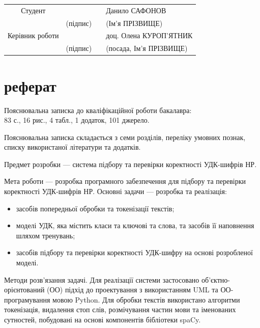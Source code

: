 \documentclass[14pt]{extarticle}
\let\oldsection\section
\renewcommand{\section}{\clearpage\oldsection}
\begin{document}
\vspace{\baselineskip}
\begin{flushright}
\begin{tabular}{clp{0.7cm}l}
  Студент         &                                      & & Данило САФОНОВ \\ \cline{2-2} \cline{4-4}
                  & \fontsize{10}{10}\selectfont(підпис) & & \fontsize{10}{10}\selectfont(Ім’я ПРІЗВИЩЕ) \\
  Керівник роботи &                                      & & доц. Олена КУРОП'ЯТНИК \\ \cline{2-2} \cline{4-4}
                  & \fontsize{10}{10}\selectfont(підпис) & & \fontsize{10}{10}\selectfont(посада, Ім’я ПРІЗВИЩЕ)\\
\end{tabular}
\end{flushright}

\section*{реферат}
\thispagestyle{empty}
Пояснювальна записка до кваліфікаційної роботи бакалавра:\\
83 с., 16 рис., 4 табл., 1 додаток, 101 джерело.

Пояснювальна записка складається з семи розділів, переліку умовних познак,
списку використаної літератури та додатків.

Предмет розробки --- система підбору та перевірки коректності
УДК-шифрів НР.

Мета роботи --- розробка програмного забезпечення
для підбору та перевірки коректності УДК-шифрів НР.
Основні задачи --- розробка та реалізація:
\begin{itemize}[itemsep=1pt,labelindent=\dimexpr{}\relax, leftmargin=*]
  \item засобів попередньої обробки та токенізації текстів;
  \item моделі УДК, яка містить класи та ключові та слова, та засобів її наповнення шляхом тренувань;
  \item засобів підбору та перевірки коректності УДК-шифру на основі розробленої моделі.
\end{itemize}

Методи розв’язання задачі.
Для реалізації системи застосовано об’єктно-орієнтований (ОО)
підхід до проектування з використанням UML та ОО-програмування мовою Python.
Для обробки текстів використано алгоритми токенізація, видалення стоп слів,
розмічування частин мови та іменованих сутностей,
побудовані на основі компонентів бібліотеки spaCy.
\end{document}
